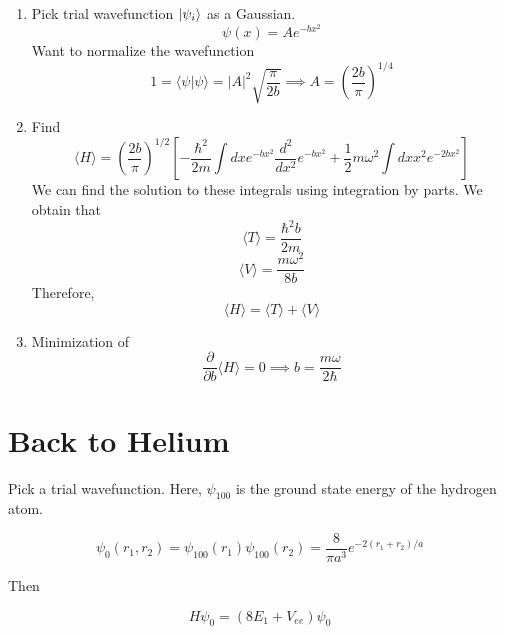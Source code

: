 \documentclass{article}
\newtheorem{one minute paper}[theorem]{One Minute Paper}
\begin{document}
\begin{enumerate}
    \item Pick trial wavefunction $\ket{\psi_i}$ as a Gaussian. 
    \begin{equation}
        \psi(x) = Ae^{-bx^2}
    \end{equation}
    Want to normalize the wavefunction 
    \begin{equation}
        1 = \langle \psi | \psi \rangle = |A|^2 \sqrt{\frac{\pi}{2b}} \implies A = \left( \frac{2b}{\pi} \right)^{1/4}
    \end{equation}
    \item Find $$\langle H \rangle = \left( \frac{2b}{\pi} \right)^{1/2}\left[ -\frac{\hbar^2}{2m} \int dx e^{-bx^2} \frac{d^2}{dx^2}e^{-bx^2} + \frac{1}{2}m\omega^2 \int dx x^2 e^{-2bx^2} \right]$$
    We can find the solution to these integrals using integration by parts. We obtain that 
    \begin{equation}
        \langle T \rangle = \frac{\hbar^2 b}{2m}
    \end{equation}
    \begin{equation}
        \langle V \rangle = \frac{m \omega^2}{8b}
    \end{equation}
    Therefore, 
    \begin{equation}
        \langle H \rangle = \langle T \rangle + \langle V \rangle
    \end{equation}
    \item Minimization of 
    \begin{equation}
        \frac{\partial}{\partial b} \langle H \rangle = 0 \implies b = \frac{m \omega}{2\hbar}
    \end{equation}
\end{enumerate}

\section*{Back to Helium}

Pick a trial wavefunction. Here, $\psi_{100}$ is the ground state energy of the hydrogen atom.

\begin{equation}
    \psi_0(r_1, r_2) = \psi_{100}(r_1)\psi_{100}(r_2) = \frac{8}{\pi a^3}e^{-2(r_1 + r_2)/a}
\end{equation}

Then 

\begin{equation}
    H\psi_0 = (8E_1 + V_{ee})\psi_0
\end{equation}
\end{document}
